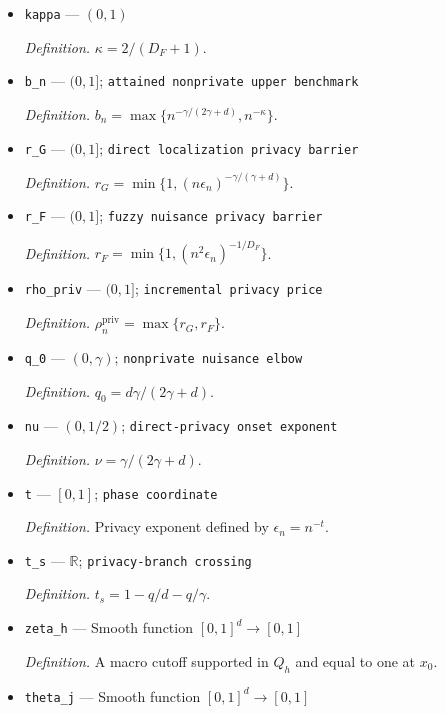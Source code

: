 \documentclass{article}
\begin{document}
\begin{itemize}
  \par\smallskip\noindent\emph{Definition.} \(D_F=1+d/\gamma+d/q\).
  \item \texttt{kappa} --- \((0,1)\)
  \par\smallskip\noindent\emph{Definition.} \(\kappa=2/(D_F+1)\).
  \item \texttt{b\_\allowbreak{}n} --- \((0,1]\); \texttt{attained nonprivate upper benchmark}
  \par\smallskip\noindent\emph{Definition.} \(b_n=\max\{n^{-\gamma/(2\gamma+d)},n^{-\kappa}\}\).
  \item \texttt{r\_\allowbreak{}G} --- \((0,1]\); \texttt{direct localization privacy barrier}
  \par\smallskip\noindent\emph{Definition.} \(r_G=\min\{1,(n\epsilon_n)^{-\gamma/(\gamma+d)}\}\).
  \item \texttt{r\_\allowbreak{}F} --- \((0,1]\); \texttt{fuzzy nuisance privacy barrier}
  \par\smallskip\noindent\emph{Definition.} \(r_F=\min\{1,(n^2\epsilon_n)^{-1/D_F}\}\).
  \item \texttt{rho\_\allowbreak{}priv} --- \((0,1]\); \texttt{incremental privacy price}
  \par\smallskip\noindent\emph{Definition.} \(\rho_n^{\mathrm{priv}}=\max\{r_G,r_F\}\).
  \item \texttt{q\_\allowbreak{}0} --- \((0,\gamma)\); \texttt{nonprivate nuisance elbow}
  \par\smallskip\noindent\emph{Definition.} \(q_0=d\gamma/(2\gamma+d)\).
  \item \texttt{nu} --- \((0,1/2)\); \texttt{direct-\allowbreak{}privacy onset exponent}
  \par\smallskip\noindent\emph{Definition.} \(\nu=\gamma/(2\gamma+d)\).
  \item \texttt{t} --- \([0,1]\); \texttt{phase coordinate}
  \par\smallskip\noindent\emph{Definition.} Privacy exponent defined by \(\epsilon_n=n^{-t}\).
  \item \texttt{t\_\allowbreak{}s} --- \(\mathbb R\); \texttt{privacy-\allowbreak{}branch crossing}
  \par\smallskip\noindent\emph{Definition.} \(t_s=1-q/d-q/\gamma\).
  \item \texttt{zeta\_\allowbreak{}h} --- Smooth function \([0,1]^d\to[0,1]\)
  \par\smallskip\noindent\emph{Definition.} A macro cutoff supported in \(Q_h\) and equal to one at \(x_0\).
  \item \texttt{theta\_\allowbreak{}j} --- Smooth function \([0,1]^d\to[0,1]\)

\end{itemize}
\end{document}
